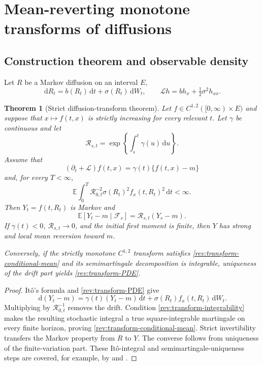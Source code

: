 \documentclass[11pt]{article}
\newtheorem{theorem}[definition]{Theorem}
\theoremstyle{remark}
\newcommand{\E}{\mathbb E}
\newcommand{\dd}{\,\mathrm d}
\begin{document}
\section{Mean-reverting monotone transforms of diffusions}

\subsection{Construction theorem and observable density}

Let $R$ be a Markov diffusion on an interval $E$,
\begin{equation}
\dd R_t=b(R_t)\dd t+\sigma(R_t)\dd W_t,
\qquad
\mathcal Lh=b h_x+\tfrac12\sigma^2 h_{xx}.
\label{rev:base-diffusion}
\end{equation}

\begin{theorem}[Strict diffusion-transform theorem]
\label{rev:thm-diffusion-transform}
Let $f\in C^{1,2}([0,\infty)\times E)$ and suppose that
$x\mapsto f(t,x)$ is strictly increasing for every relevant $t$.  Let
$\gamma$ be continuous and let
\begin{equation}
\mathcal R_{s,t}=\exp\!\left\{\int_s^t\gamma(u)\dd u\right\}.
\label{rev:R-gamma}
\end{equation}
Assume that
\begin{equation}
(\partial_t+\mathcal L)f(t,x)=\gamma(t)\{f(t,x)-m\}
\label{rev:transform-PDE}
\end{equation}
and, for every $T<\infty$,
\begin{equation}
\E\int_0^T \mathcal R_{0,t}^{-2}
\sigma(R_t)^2f_x(t,R_t)^2\dd t<\infty.
\label{rev:transform-integrability}
\end{equation}
Then $Y_t=f(t,R_t)$ is Markov and
\begin{equation}
\E[Y_t-m\mid\mathcal F_s]=\mathcal R_{s,t}(Y_s-m).
\label{rev:transform-conditional-mean}
\end{equation}
If $\gamma(t)<0$, $\mathcal R_{s,t}\to0$, and the initial first moment is finite,
then $Y$ has strong and local mean reversion toward $m$.

Conversely, if the strictly monotone $C^{1,2}$ transform satisfies
\eqref{rev:transform-conditional-mean} and its semimartingale decomposition is
integrable, uniqueness of the drift part yields \eqref{rev:transform-PDE}.
\end{theorem}

\begin{proof}
It\^o's formula and \eqref{rev:transform-PDE} give
\[
\dd(Y_t-m)=\gamma(t)(Y_t-m)\dd t
+\sigma(R_t)f_x(t,R_t)\dd W_t.
\]
Multiplying by $\mathcal R_{0,t}^{-1}$ removes the drift.  Condition
\eqref{rev:transform-integrability} makes the resulting stochastic integral a
true square-integrable martingale on every finite horizon, proving
\eqref{rev:transform-conditional-mean}.  Strict invertibility transfers the
Markov property from $R$ to $Y$.  The converse follows from uniqueness of the
finite-variation part.  These It\^o-integral and semimartingale-uniqueness steps
are covered, for example, by \citet{KaratzasShreve1991} and
\citet{Protter2005}.
\end{proof}
\end{document}
